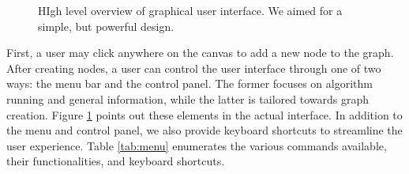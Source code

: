 \documentclass[aps,final,twocolumn,letterpaper,nofootinbib]{revtex4-1}
\begin{document}
\begin{figure}[ht]
\caption{HIgh level overview of graphical user interface.
We aimed for a simple, but powerful design.}
\label{fig:ui}
\end{figure}

First, a user may click anywhere on the canvas to add a new node to the graph.
After creating nodes,
a user can control the user interface through one of two ways:
the menu bar and the control panel.
The former focuses on algorithm running and general information,
while the latter is tailored towards graph creation.
Figure \ref{fig:ui} points out these elements in the actual interface.
In addition to the menu and control panel,
we also provide keyboard shortcuts to streamline the user experience.
Table \ref{tab:menu} enumerates the various commands available,
their functionalities, and keyboard shortcuts.
\end{document}
